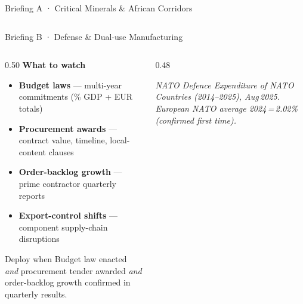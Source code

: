 \documentclass[aspectratio=169,10pt]{beamer}
\newcommand{\src}[1]{{\vspace{1pt}\par\raggedright\tiny\color{steel}\itshape #1}}
\newcommand{\er}{{\textcolor{navy}{\rule{16pt}{2.5pt}}}\enspace}
\begin{document}
\begin{frame}{Briefing A · Critical Minerals \& African Corridors}
\begin{columns}[T,totalwidth=\textwidth]
\end{columns}
\end{frame}

\begin{frame}{Briefing B · Defense \& Dual-use Manufacturing}
\begin{columns}[T,totalwidth=\textwidth]

\begin{column}{0.50\textwidth}
{\scriptsize\bfseries\color{navy}What to watch}\\[4pt]
{\footnotesize\begin{itemize}\setlength\itemsep{3pt}
  \item \textbf{Budget laws} — multi-year commitments (\% GDP + EUR totals)
  \item \textbf{Procurement awards} — contract value, timeline, local-content clauses
  \item \textbf{Order-backlog growth} — prime contractor quarterly reports
  \item \textbf{Export-control shifts} — component supply-chain disruptions
\end{itemize}}
\vspace{6pt}
\begin{block}{\small Deploy when}
{\footnotesize Budget law enacted \textit{and} procurement tender awarded
\textit{and} order-backlog growth confirmed in quarterly results.}
\end{block}
\end{column}

\begin{column}{0.48\textwidth}
\src{NATO Defence Expenditure of NATO Countries (2014–2025), Aug\,2025.
European NATO average 2024\,=\,2.02\% (confirmed first time).}
\end{column}

\end{columns}
\end{frame}
\end{document}

